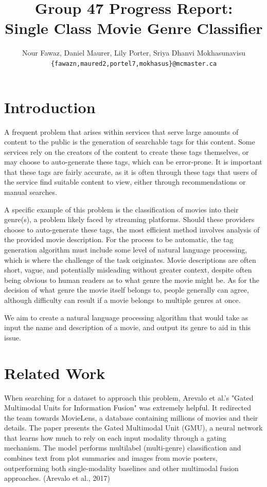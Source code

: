 \documentclass[11pt]{article}
\title{Group 47 Progress Report:\\Single Class Movie Genre Classifier}
\author{Nour Fawaz, Daniel Maurer, Lily Porter, Sriya Dhanvi Mokhasunavisu\\
  \texttt{\{fawazn,maured2,portel7,mokhasus\}@mcmaster.ca} }
\begin{document}
\maketitle

\section{Introduction}

A frequent problem that arises within services that serve large amounts of content to the public is the generation of searchable tags for this content. Some services rely on the creators of the content to create these tags themselves, or may choose to auto-generate these tags, which can be error-prone. It is important that these tags are fairly accurate, as it is often through these tags that users of the service find suitable content to view, either through recommendations or manual searches.

A specific example of this problem is the classification of movies into their genre(s), a problem likely faced by streaming platforms. Should these providers choose to auto-generate these tags, the most efficient method involves analysis of the provided movie description. For the process to be automatic, the tag generation algorithm must include some level of natural language processing, which is where the challenge of the task originates. Movie descriptions are often short, vague, and potentially misleading without greater context, despite often being obvious to human readers as to what genre the movie might be. As for the decision of what genre the movie itself belongs to, people generally can agree, although difficulty can result if a movie belongs to multiple genres at once.

We aim to create a natural language processing algorithm that would take as input the name and description of a movie, and output its genre to aid in this issue.

\section{Related Work}

When searching for a dataset to approach this problem, Arevalo et al.'s "Gated Multimodal Units for Information Fusion" was extremely helpful. It redirected the team towards MovieLens, a database containing millions of movies and their details. The paper presents the Gated Multimodal Unit (GMU), a neural network that learns how much to rely on each input modality through a gating mechanism. The model performs multilabel (multi-genre) classification and combines text from plot summaries and images from movie posters, outperforming both single-modality baselines and other multimodal fusion approaches. (Arevalo et al., 2017)
\end{document}
